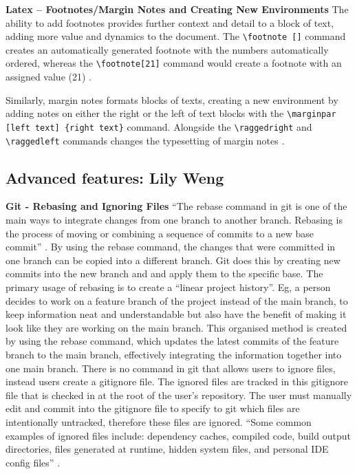 \documentclass[a4paper, 11pt]{report}
\begin{document}
\textbf{Latex – Footnotes/Margin Notes and Creating New Environments}
The ability to add footnotes provides further context and detail to a block of text, adding more value and dynamics to the document. The \verb|\footnote []| command creates an automatically generated footnote with the numbers automatically ordered, whereas the \verb|\footnote[21]| command would create a footnote with an assigned value (21) \cite{ali8}.

Similarly, margin notes formats blocks of texts, creating a new environment by adding notes on either the right or the left of text blocks with the \verb|\marginpar [left text] {right text}| command. Alongside the \verb|\raggedright| and \verb|\raggedleft| commands changes the typesetting of margin notes \cite{ali9}.


\subsection{Advanced features: Lily Weng}

\textbf{Git - Rebasing and Ignoring Files}
“The rebase command in git is one of the main ways to integrate changes from one branch to another branch. Rebasing is the process of moving or combining a sequence of commits to a new base commit” \cite{l9}. By using the rebase command, the changes that were committed in one branch can be copied into a different branch. Git does this by creating new commits into the new branch and and apply them to the specific base. The primary usage of rebasing is to create a “linear project history”. Eg, a person decides to work on a feature branch of the project instead of the main branch, to keep information neat and understandable but also have the benefit of making it look like they are working on the main branch. This organised method is created by using the rebase command, which updates the latest commits of the feature branch to the main branch, effectively integrating the information together into one main branch.
There is no command in git that allows users to ignore files, instead users create a gitignore file. The ignored files are tracked in this gitignore file that is checked in at the root of the user’s repository. The user must manually edit and commit into the gitignore file to specify to git which files are intentionally untracked, therefore these files are ignored. “Some common examples of ignored files include: dependency caches, compiled code, build output directories, files generated at runtime, hidden system files, and personal IDE config files”  \cite{l11}.
\end{document}
